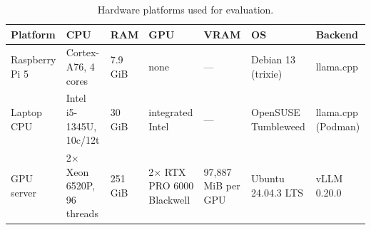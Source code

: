 \begin{table}[t]
\centering
\caption{Hardware platforms used for evaluation.}
\label{tab:hardware-platforms}
\scriptsize
\setlength{\tabcolsep}{3.2pt}
\renewcommand{\arraystretch}{1.08}
\begin{tabularx}{\textwidth}{@{}lLLLLLL@{}}
\toprule
\textbf{Platform} & \textbf{CPU} & \textbf{RAM} & \textbf{GPU} & \textbf{VRAM} & \textbf{OS} & \textbf{Backend} \\
\midrule
Raspberry Pi 5 & Cortex-A76, 4 cores & 7.9 GiB & none & --- & Debian 13 (trixie) & llama.cpp \\
Laptop CPU & Intel i5-1345U, 10c/12t & 30 GiB & integrated Intel & --- & OpenSUSE Tumbleweed & llama.cpp (Podman) \\
GPU server & 2$\times$ Xeon 6520P, 96 threads & 251 GiB & 2$\times$ RTX PRO 6000 Blackwell & 97,887 MiB per GPU & Ubuntu 24.04.3 LTS & vLLM 0.20.0 \\
\bottomrule
\end{tabularx}
\end{table}
